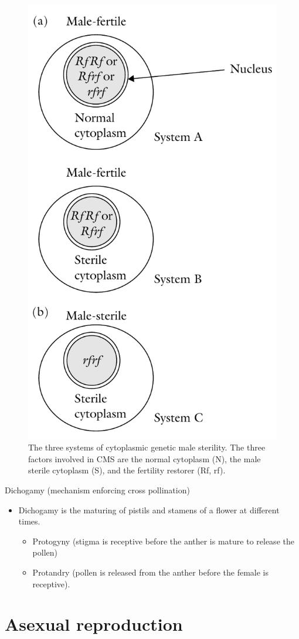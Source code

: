 \documentclass[11pt,ignorenonframetext,aspectratio=169]{beamer}
\providecommand{\tightlist}{%
  \setlength{\itemsep}{0pt}\setlength{\parskip}{0pt}}
\begin{document}
\begin{frame}{}
\protect\hypertarget{section-15}{}
\begin{figure}

{\centering \includegraphics[width=0.3\linewidth]{./images/cgms_systems} 

}

\caption{The three systems of cytoplasmic genetic male sterility. The three factors involved in CMS are the normal cytoplasm (N), the male sterile cytoplasm (S), and the fertility restorer (Rf, rf).}\label{fig:cgms-systems}
\end{figure}
\end{frame}

\begin{frame}{Dichogamy (mechanism enforcing cross pollination)}
\protect\hypertarget{dichogamy-mechanism-enforcing-cross-pollination}{}
\begin{itemize}
\tightlist
\item
  Dichogamy is the maturing of pistils and stamens of a flower at
  different times.

  \begin{itemize}
  \tightlist
  \item
    Protogyny (stigma is receptive before the anther is mature to
    release the pollen)
  \item
    Protandry (pollen is released from the anther before the female is
    receptive).
  \end{itemize}
\end{itemize}
\end{frame}

\hypertarget{asexual-reproduction}{%
\section{Asexual reproduction}\label{asexual-reproduction}}
\end{document}
